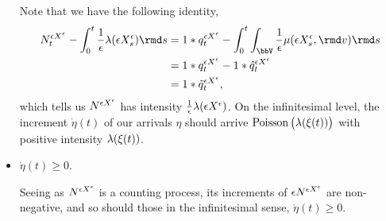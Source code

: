 \begin{itemize}
    Note that we have the following identity,
    \begin{align*}
      \N^{\Xe}_t - \int_0^t \frac1\epsilon \affInt(\Xe_s) \rmd s
      &= 1 \ast \jumpMeas^{\Xe}_t - \int_0^t \int_\vecSpace \frac1\epsilon\affJump(\Xe_s, \rmd\markVar) \rmd s \\
      &= 1 \ast \jumpMeas^{\Xe}_t - 1 \ast \predproj{\jumpMeas^{\Xe}}_t \\
      &= 1 \ast \compensate{\jumpMeas^{\Xe}}_t,
    \end{align*}
    which tells us $N^{\epsilon X^\epsilon}$ has intensity $\frac1\epsilon\lambda(\epsilon X^\epsilon)$.
    On the infinitesimal level, the increment $\dot\eta(t)$ of our arrivals $\eta$ should arrive $\operatorname{Poisson}\big(\lambda(\xi(t))\big)$ with positive intensity $\lambda(\xi(t))$.
  \item
    $\dot\eta(t) \geq 0$.

    Seeing as $N^{\epsilon X^\epsilon}$ is a counting process, its increments of $\epsilon N^{\epsilon X^\epsilon}$ are non-negative, and so should those in the infinitesimal sense, $\dot\eta(t) \geq 0$.
\end{itemize}

